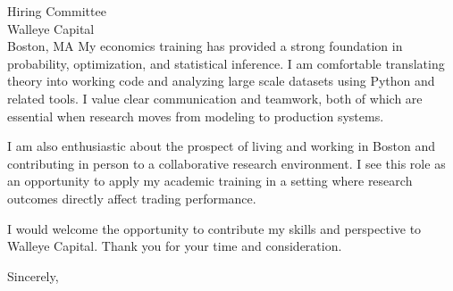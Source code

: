\documentclass[11pt]{letter}
\begin{document}
\begin{letter}{Hiring Committee \\ Walleye Capital \\ Boston, MA}
My economics training has provided a strong foundation in probability, optimization, and statistical inference. I am comfortable translating theory into working code and analyzing large scale datasets using Python and related tools. I value clear communication and teamwork, both of which are essential when research moves from modeling to production systems.

I am also enthusiastic about the prospect of living and working in Boston and contributing in person to a collaborative research environment. I see this role as an opportunity to apply my academic training in a setting where research outcomes directly affect trading performance.

I would welcome the opportunity to contribute my skills and perspective to Walleye Capital. Thank you for your time and consideration.

\closing{Sincerely,}

\end{letter}
\end{document}
